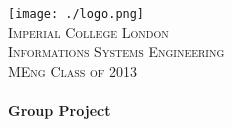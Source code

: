 \begin{titlepage}
\begin{center}

\texttt{[image: ./logo.png]}\\[0.45cm]    

\textsc{\LARGE Imperial College London}\\[1cm]
\textsc{\Large Informations Systems Engineering \\ \vspace{5pt} MEng Class of 2013}\\[0.5cm]


\HRule \\[0.4cm]
{ \huge \bfseries Group Project}\\[0.4cm]

\HRule \\[1.5cm]


\end{center}
\end{titlepage}
